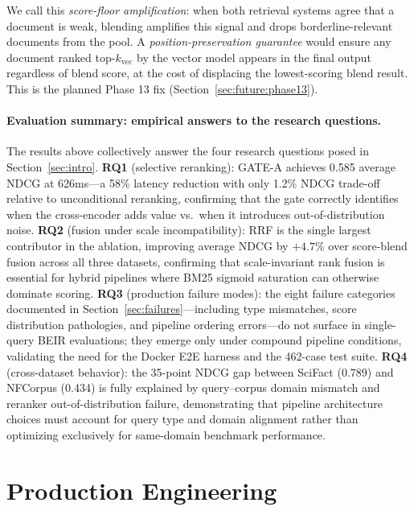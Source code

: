 \documentclass[11pt]{article}
\begin{document}
We call this \emph{score-floor amplification}: when both retrieval systems agree that a
document is weak, blending amplifies this signal and drops borderline-relevant documents
from the pool. A \emph{position-preservation guarantee} would ensure any document
ranked top-$k_{\text{vec}}$ by the vector model appears in the final output regardless
of blend score, at the cost of displacing the lowest-scoring blend result. This is the
planned Phase 13 fix (Section~\ref{sec:future:phase13}).

\paragraph{Evaluation summary: empirical answers to the research questions.}
The results above collectively answer the four research questions posed in
Section~\ref{sec:intro}. \textbf{RQ1} (selective reranking): GATE-A achieves 0.585
average NDCG at 626ms---a 58\% latency reduction with only 1.2\% NDCG trade-off
relative to unconditional reranking, confirming that the gate correctly identifies
when the cross-encoder adds value vs.\ when it introduces out-of-distribution noise.
\textbf{RQ2} (fusion under scale incompatibility): RRF is the single largest
contributor in the ablation, improving average NDCG by $+4.7\%$ over score-blend
fusion across all three datasets, confirming that scale-invariant rank fusion is
essential for hybrid pipelines where BM25 sigmoid saturation can otherwise dominate
scoring. \textbf{RQ3} (production failure modes): the eight failure categories
documented in Section~\ref{sec:failures}---including type mismatches, score
distribution pathologies, and pipeline ordering errors---do not surface in single-query
BEIR evaluations; they emerge only under compound pipeline conditions, validating the
need for the Docker E2E harness and the 462-case test suite. \textbf{RQ4}
(cross-dataset behavior): the 35-point NDCG gap between SciFact (0.789) and NFCorpus
(0.434) is fully explained by query--corpus domain mismatch and reranker
out-of-distribution failure, demonstrating that pipeline architecture choices must
account for query type and domain alignment rather than optimizing exclusively for
same-domain benchmark performance.

\section{Production Engineering}
\label{sec:deployment}
\end{document}

